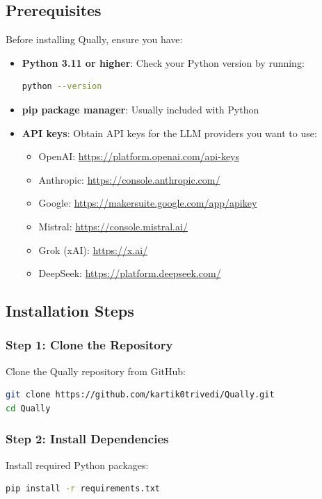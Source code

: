 \documentclass[11pt,a4paper]{article}
\begin{document}
\subsection{Prerequisites}
Before installing Qually, ensure you have:

\begin{itemize}
    \item \textbf{Python 3.11 or higher}: Check your Python version by running:
    \begin{lstlisting}[language=bash]
python --version
    \end{lstlisting}
    \item \textbf{pip package manager}: Usually included with Python
    \item \textbf{API keys}: Obtain API keys for the LLM providers you want to use:
    \begin{itemize}
        \item OpenAI: \url{https://platform.openai.com/api-keys}
        \item Anthropic: \url{https://console.anthropic.com/}
        \item Google: \url{https://makersuite.google.com/app/apikey}
        \item Mistral: \url{https://console.mistral.ai/}
        \item Grok (xAI): \url{https://x.ai/}
        \item DeepSeek: \url{https://platform.deepseek.com/}
    \end{itemize}
\end{itemize}

\subsection{Installation Steps}

\subsubsection{Step 1: Clone the Repository}
Clone the Qually repository from GitHub:
\begin{lstlisting}[language=bash]
git clone https://github.com/kartik0trivedi/Qually.git
cd Qually
\end{lstlisting}

\subsubsection{Step 2: Install Dependencies}
Install required Python packages:
\begin{lstlisting}[language=bash]
pip install -r requirements.txt
\end{lstlisting}
\end{document}

